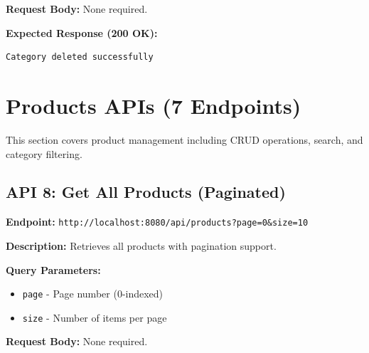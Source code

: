 \documentclass[12pt, a4paper]{article}
\begin{document}
\textbf{Request Body:} None required.

\textbf{Expected Response (200 OK):}
\begin{lstlisting}
Category deleted successfully
\end{lstlisting}

\newpage

\section{Products APIs (7 Endpoints)}

This section covers product management including CRUD operations, search, and category filtering.

\subsection{API 8: Get All Products (Paginated)}

\begin{tcolorbox}[colback=getcolor!10, colframe=getcolor, title=GET]
\textbf{Endpoint:} \texttt{http://localhost:8080/api/products?page=0\&size=10}
\end{tcolorbox}

\textbf{Description:} Retrieves all products with pagination support.

\textbf{Query Parameters:}
\begin{itemize}
    \item \texttt{page} - Page number (0-indexed)
    \item \texttt{size} - Number of items per page
\end{itemize}

\textbf{Request Body:} None required.
\end{document}
